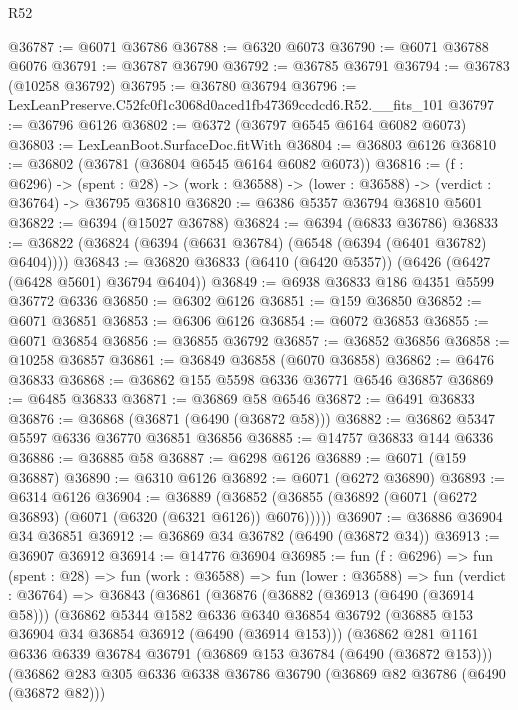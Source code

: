 \begin{lexlean}{R52}
\begin{coremodule}
@36787 := @6071 @36786
@36788 := @6320 @6073
@36790 := @6071 @36788 @6076
@36791 := @36787 @36790
@36792 := @36785 @36791
@36794 := @36783 (@10258 @36792)
@36795 := @36780 @36794
@36796 := LexLeanPreserve.C52fc0f1c3068d0aced1fb47369ccdcd6.R52.__fits_101
@36797 := @36796 @6126
@36802 := @6372 (@36797 @6545 @6164 @6082 @6073)
@36803 := LexLeanBoot.SurfaceDoc.fitWith
@36804 := @36803 @6126
@36810 := @36802 (@36781 (@36804 @6545 @6164 @6082 @6073))
@36816 := (f : @6296) ->
  (spent : @28) -> (work : @36588) -> (lower : @36588) -> (verdict : @36764) -> @36795 @36810
@36820 := @6386 @5357 @36794 @36810 @5601
@36822 := @6394 (@15027 @36788)
@36824 := @6394 (@6833 @36786)
@36833 := @36822 (@36824 (@6394 (@6631 @36784) (@6548 (@6394 (@6401 @36782) @6404))))
@36843 := @36820 @36833 (@6410 (@6420 @5357)) (@6426 (@6427 (@6428 @5601) @36794 @6404))
@36849 := @6938 @36833 @186 @4351 @5599 @36772 @6336
@36850 := @6302 @6126
@36851 := @159 @36850
@36852 := @6071 @36851
@36853 := @6306 @6126
@36854 := @6072 @36853
@36855 := @6071 @36854
@36856 := @36855 @36792
@36857 := @36852 @36856
@36858 := @10258 @36857
@36861 := @36849 @36858 (@6070 @36858)
@36862 := @6476 @36833
@36868 := @36862 @155 @5598 @6336 @36771 @6546 @36857
@36869 := @6485 @36833
@36871 := @36869 @58 @6546
@36872 := @6491 @36833
@36876 := @36868 (@36871 (@6490 (@36872 @58)))
@36882 := @36862 @5347 @5597 @6336 @36770 @36851 @36856
@36885 := @14757 @36833 @144 @6336
@36886 := @36885 @58
@36887 := @6298 @6126
@36889 := @6071 (@159 @36887)
@36890 := @6310 @6126
@36892 := @6071 (@6272 @36890)
@36893 := @6314 @6126
@36904 := @36889
    (@36852 (@36855 (@36892 (@6071 (@6272 @36893) (@6071 (@6320 (@6321 @6126)) @6076)))))
@36907 := @36886 @36904 @34 @36851
@36912 := @36869 @34 @36782 (@6490 (@36872 @34))
@36913 := @36907 @36912
@36914 := @14776 @36904
@36985 := fun (f : @6296) =>
  fun (spent : @28) =>
  fun (work : @36588) =>
  fun (lower : @36588) =>
  fun (verdict : @36764) =>
  @36843
    (@36861
      (@36876
        (@36882
          (@36913 (@6490 (@36914 @58)))
          (@36862
            @5344
            @1582
            @6336
            @6340
            @36854
            @36792
            (@36885 @153 @36904 @34 @36854 @36912 (@6490 (@36914 @153)))
            (@36862
              @281
              @1161
              @6336
              @6339
              @36784
              @36791
              (@36869 @153 @36784 (@6490 (@36872 @153)))
              (@36862
                @283
                @305
                @6336
                @6338
                @36786
                @36790
                (@36869 @82 @36786 (@6490 (@36872 @82)))

\end{coremodule}
\end{lexlean}
